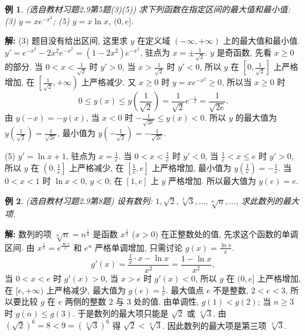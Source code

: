 \documentclass[UTF8,openany]{ctexbook}
\theoremstyle{chinesetextbook}
\newtheorem{example}{例}[section]
\newenvironment{cnsolution}{\par\indent\textbf{解:} \ignorespaces}{\par}
\begin{document}
\begin{example}\label{ex:c2-h9-5}
\textnormal{(选自教材习题2.9第5题(3)(5))} 求下列函数在指定区间的最大值和最小值: (3) $y=xe^{-x^2}$; (5) $y=x\ln x$, $(0,e]$.
\end{example}
\begin{cnsolution}
(3) 题目没有给出区间, 这里求 $y$ 在定义域 $(-\infty,+\infty)$ 上的最大值和最小值. $y'=e^{-x^2}-2x^2e^{-x^2}=(1-2x^2)e^{-x^2}$, 驻点为 $\displaystyle x=\pm\frac1{\sqrt2}$. $y$ 是奇函数, 先看 $x\ge0$ 的部分. 当 $\displaystyle0<x<\frac1{\sqrt2}$ 时 $y'>0$, 当 $\displaystyle x>\frac1{\sqrt2}$ 时 $y'<0$, 所以 $y$ 在 $\displaystyle\left[0,\frac1{\sqrt2}\right]$ 上严格增加, 在 $\displaystyle\left[\frac1{\sqrt2},+\infty\right)$ 上严格减少. 又 $x\ge0$ 时 $y=xe^{-x^2}\ge0$, 所以当 $x\ge0$ 时
\[
0\le y(x)\le y\left(\frac1{\sqrt2}\right)=\frac1{\sqrt2}e^{-\frac12}=\frac1{\sqrt{2e}}.
\]
由 $y(-x)=-y(x)$, 当 $x<0$ 时 $\displaystyle-\frac1{\sqrt{2e}}\le y(x)<0$. 所以 $y$ 的最大值为 $\displaystyle y\left(\frac1{\sqrt2}\right)=\frac1{\sqrt{2e}}$, 最小值为 $\displaystyle y\left(-\frac1{\sqrt2}\right)=-\frac1{\sqrt{2e}}$.

(5) $y'=\ln x+1$, 驻点为 $\displaystyle x=\frac1e$. 当 $\displaystyle0<x<\frac1e$ 时 $y'<0$, 当 $\displaystyle\frac1e<x\le e$ 时 $y'>0$, 所以 $y$ 在 $\displaystyle\left(0,\frac1e\right]$ 上严格减少, 在 $\displaystyle\left[\frac1e,e\right]$ 上严格增加, 最小值为 $\displaystyle y\left(\frac1e\right)=-\frac1e$. 当 $0<x<1$ 时 $\ln x<0$, $y<0$; 在 $[1,e]$ 上 $y$ 严格增加. 所以最大值为 $y(e)=e$.
\end{cnsolution}
\begin{example}\label{ex:c2-h9-8}
\textnormal{(选自教材习题2.9第8题)} 设有数列: $1,\sqrt2,\sqrt[3]3,\ldots,\sqrt[n]n,\ldots$, 求此数列的最大项.
\end{example}
\begin{cnsolution}
数列的项 $\sqrt[n]n=n^{\frac1n}$ 是函数 $x^{\frac1x}$ ($x>0$) 在正整数处的值, 先求这个函数的单调区间. 由 $x^{\frac1x}=e^{\frac{\ln x}x}$ 和 $e^u$ 严格单调增加, 只需讨论 $\displaystyle g(x)=\frac{\ln x}x$.
\[
g'(x)=\frac{\frac1x\cdot x-\ln x}{x^2}=\frac{1-\ln x}{x^2},
\]
当 $0<x<e$ 时 $g'(x)>0$, 当 $x>e$ 时 $g'(x)<0$, 所以 $g$ 在 $(0,e]$ 上严格增加, 在 $[e,+\infty)$ 上严格减少, 最大值为 $\displaystyle g(e)=\frac1e$. 最大值点 $e$ 不是整数, $2<e<3$, 所以要比较 $g$ 在 $e$ 两侧的整数 $2$ 与 $3$ 处的值. 由单调性, $g(1)<g(2)$; 当 $n\ge3$ 时 $g(n)\le g(3)$. 于是数列的最大项只能是 $\sqrt2$ 或 $\sqrt[3]3$. 由 $\left(\sqrt2\right)^6=8<9=\left(\sqrt[3]3\right)^6$ 得 $\sqrt2<\sqrt[3]3$. 因此数列的最大项是第三项 $\sqrt[3]3$.
\end{cnsolution}
\end{document}
